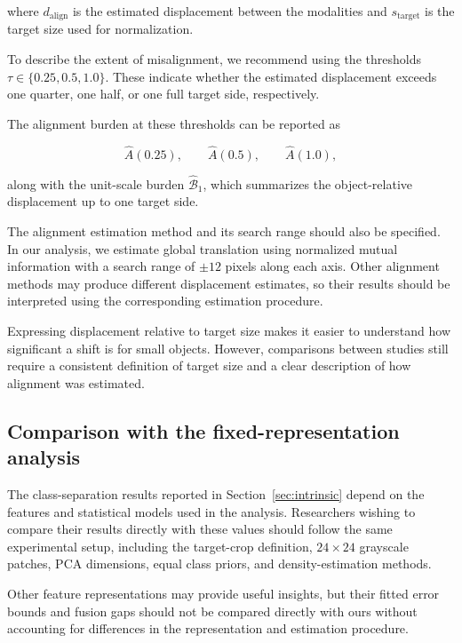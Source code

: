 \documentclass[10pt]{article}
\begin{document}
where $d_{\mathrm{align}}$ is the estimated displacement between the modalities and $s_{\mathrm{target}}$ is the target size used for normalization.

To describe the extent of misalignment, we recommend using the thresholds $\tau\in\{0.25,0.5,1.0\}$. These indicate whether the estimated displacement exceeds one quarter, one half, or one full target side, respectively.

The alignment burden at these thresholds can be reported as

\begin{equation}
\widehat A(0.25), \qquad
\widehat A(0.5), \qquad
\widehat A(1.0),
\end{equation}

along with the unit-scale burden $\widehat{\mathcal B}_1$, which summarizes the object-relative displacement up to one target side.

The alignment estimation method and its search range should also be specified. In our analysis, we estimate global translation using normalized mutual information with a search range of $\pm12$ pixels along each axis. Other alignment methods may produce different displacement estimates, so their results should be interpreted using the corresponding estimation procedure.

Expressing displacement relative to target size makes it easier to understand how significant a shift is for small objects. However, comparisons between studies still require a consistent definition of target size and a clear description of how alignment was estimated.

\subsection{Comparison with the fixed-representation analysis}

The class-separation results reported in Section~\ref{sec:intrinsic} depend on the features and statistical models used in the analysis. Researchers wishing to compare their results directly with these values should follow the same experimental setup, including the target-crop definition, $24\times24$ grayscale patches, PCA dimensions, equal class priors, and density-estimation methods.

Other feature representations may provide useful insights, but their fitted error bounds and fusion gaps should not be compared directly with ours without accounting for differences in the representation and estimation procedure.
\end{document}
